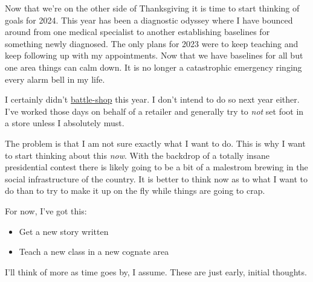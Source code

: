 Now that we're on the other side of Thanksgiving it is time to start
thinking of goals for 2024. This year has been a diagnostic odyssey
where I have bounced around from one medical specialist to another
establishing baselines for something newly diagnosed. The only plans for
2023 were to keep teaching and keep following up with my appointments.
Now that we have baselines for all but one area things can calm down. It
is no longer a catastrophic emergency ringing every alarm bell in my
life.

I certainly didn't
\href{https://web.archive.org/web/20231125065019/https://www.starbeacon.com/news/black-friday-isnt-what-it-used-to-be/article_a51ba54c-8ac3-11ee-8793-ebb3796395ec.html}{battle-shop}
this year. I don't intend to do so next year either. I've worked those
days on behalf of a retailer and generally try to \emph{not} set foot in
a store unless I absolutely must.

The problem is that I am not sure exactly what I want to do. This is why
I want to start thinking about this \emph{now}. With the backdrop of a
totally insane presidential contest there is likely going to be a bit of
a malestrom brewing in the social infrastructure of the country. It is
better to think now as to what I want to do than to try to make it up on
the fly while things are going to crap.

For now, I've got this:

\begin{itemize}
\tightlist
\item
  Get a new story written
\item
  Teach a new class in a new cognate area
\end{itemize}

I'll think of more as time goes by, I assume. These are just early,
initial thoughts.
